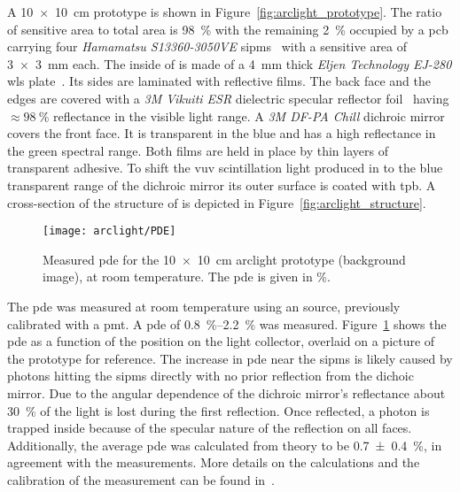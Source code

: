A \SI{10 x 10}{\centi\metre} \AL{} prototype is shown in Figure~\ref{fig:arclight_prototype}.
The ratio of sensitive area to total area is \SI{98}{\percent} with the remaining \SI{2}{\percent} occupied by a \gls{pcb} carrying four \emph{Hamamatsu S13360-3050VE} \glspl{sipm}~\cite{arclight_sipm} with a sensitive area of \SI{3 x 3}{\milli\metre} each.
The inside of \AL{} is made of a \SI{4}{\milli\metre} thick \emph{Eljen Technology EJ-280} \gls{wls} plate~\cite{arclight_wls}.
Its sides are laminated with reflective films.
The back face and the edges are covered with a \emph{3M Vikuiti ESR} dielectric specular reflector foil~\cite{arclight_esr} having $\approx \SI{98}{\percent}$ reflectance in the visible light range.
A \emph{3M DF-PA Chill} dichroic mirror~\cite{arclight_dichroic} covers the front face.
It is transparent in the blue and has a high reflectance in the green spectral range.
Both films are held in place by thin layers of transparent adhesive.
To shift the \gls{vuv} scintillation light produced in \lar{} to the blue transparent range of the dichroic mirror its outer surface is coated with \gls{tpb}.
A cross-section of the structure of \AL{} is depicted in Figure~\ref{fig:arclight_structure}.

\begin{figure}[tbp]
	\centering
	\texttt{[image: arclight/PDE]}
	\caption[Measured  ]{%
		Measured \acrshort{pde} for the \SI{10 x 10}{\centi\metre} \acrshort{arclight} prototype (background image), at room temperature.
		The \acrshort{pde} is given in \si{\percent}.
	}
	\label{fig:arclight_pde}
\end{figure}

The \gls{pde} was measured at room temperature using an  source, previously calibrated with a \gls{pmt}.
A \gls{pde} of \SIrange{0.8}{2.2}{\percent} was measured.
Figure~\ref{fig:arclight_pde} shows the \gls{pde} as a function of the position on the light collector, overlaid on a picture of the prototype for reference.
The increase in \gls{pde} near the \glspl{sipm} is likely caused by photons hitting the \glspl{sipm} directly with no prior reflection from the dichoic mirror.
Due to the angular dependence of the dichroic mirror's reflectance about \SI{30}{\percent} of the light is lost during the first reflection.
Once reflected, a photon is trapped inside \AL{} because of the specular nature of the reflection on all faces.
Additionally, the average \gls{pde} was calculated from theory to be \SI{0.7 +- 0.4}{\percent}, in agreement with the measurements.
More details on the calculations and the calibration of the measurement can be found in~\cite{arclight}.

